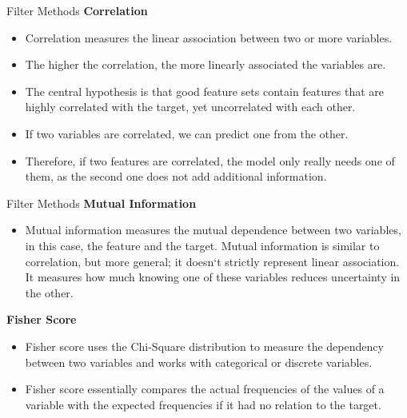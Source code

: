 \documentclass[11pt]{beamer}
\begin{document}
%
%
\begin{frame}{Filter Methods}
\textbf{Correlation}
	\begin{itemize}
		\item Correlation measures the linear association between two or more variables. 
		\item The higher the correlation, the more linearly associated the variables are. 
		\item The central hypothesis is that good feature sets contain features that are highly correlated with the target, yet uncorrelated with each other.
		\item If two variables are correlated, we can predict one from the other. 
		\item Therefore, if two features are correlated, the model only really needs one of them, as the second one does not add additional information.
	\end{itemize}
\end{frame}
%
%
\begin{frame}{Filter Methods}
\textbf{Mutual Information}
	\begin{itemize}
		\item Mutual information measures the mutual dependence between two variables, in this case, the feature and the target. Mutual information is similar to correlation, but more general; it doesn`t strictly represent linear association. It measures how much knowing one of these variables reduces uncertainty in the other.
	\end{itemize}
\textbf{Fisher Score}
	\begin{itemize}
		\item Fisher score uses the Chi-Square distribution to measure the dependency between two variables and works with categorical or discrete variables.
		\item Fisher score essentially compares the actual frequencies of the values of a variable with the expected frequencies if it had no relation to the target.
	\end{itemize}
\end{frame}
%
%
\end{document}
